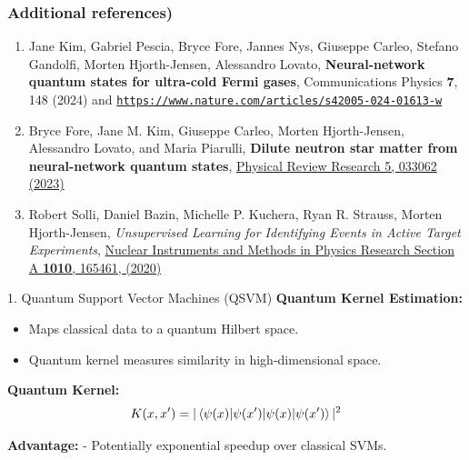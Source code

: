 \documentclass{beamer}
\begin{document}
\begin{frame}
\frametitle{Additional references)}
\begin{enumerate}

\item Jane Kim, Gabriel Pescia, Bryce Fore, Jannes Nys, Giuseppe Carleo, Stefano Gandolfi, Morten Hjorth-Jensen, Alessandro Lovato, \textbf{Neural-network quantum states for ultra-cold Fermi gases}, Communications Physics \textbf{7}, 148 (2024) and \href{{https://www.nature.com/articles/s42005-024-01613-w}}{\nolinkurl{https://www.nature.com/articles/s42005-024-01613-w}}

\item Bryce Fore, Jane M. Kim, Giuseppe Carleo, Morten Hjorth-Jensen, Alessandro Lovato, and Maria Piarulli, \textbf{Dilute neutron star matter from neural-network quantum states}, \href{{https://journals.aps.org/prresearch/abstract/10.1103/PhysRevResearch.5.033062}}{Physical Review  Research 5, 033062 (2023)}

\item Robert Solli, Daniel Bazin, Michelle P. Kuchera, Ryan R. Strauss, Morten Hjorth-Jensen, \emph{Unsupervised Learning for Identifying Events in Active Target Experiments}, \href{{https://www.sciencedirect.com/science/article/abs/pii/S0168900221004460}}{Nuclear Instruments and Methods in Physics Research Section A \textbf{1010}, 165461, (2020)}

\end{enumerate}
\end{frame}








\begin{frame}{1. Quantum Support Vector Machines (QSVM)}
\textbf{Quantum Kernel Estimation:}
\begin{itemize}
    \item Maps classical data to a quantum Hilbert space.
    \item Quantum kernel measures similarity in high-dimensional space.
\end{itemize}

\pause
\textbf{Quantum Kernel:}
\[
K(x, x') = |\braket{\psi(x) | \psi(x')}|^2
\]

\textbf{Advantage:}
- Potentially exponential speedup over classical SVMs.
\end{frame}
\end{document}
